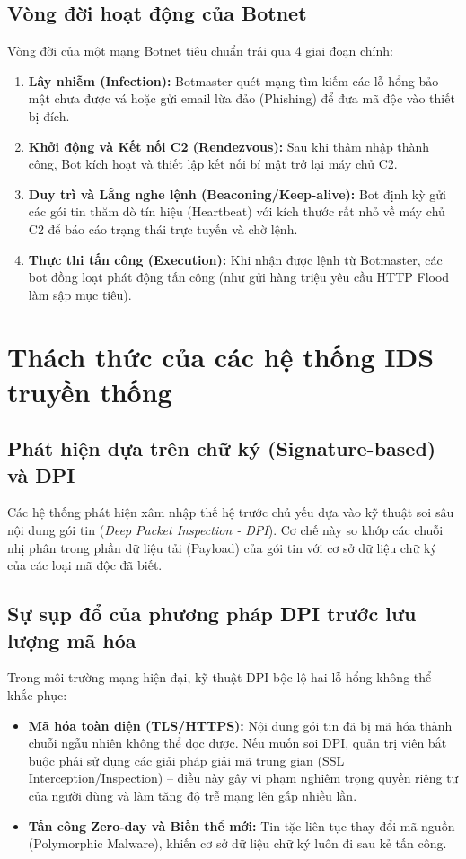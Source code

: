 \documentclass[12pt,a4paper,oneside]{report}
\begin{document}
\subsection{Vòng đời hoạt động của Botnet}
Vòng đời của một mạng Botnet tiêu chuẩn trải qua 4 giai đoạn chính:
\begin{enumerate}
  \item \textbf{Lây nhiễm (Infection):} Botmaster quét mạng tìm kiếm các lỗ hổng bảo mật chưa được vá hoặc gửi email lừa đảo (Phishing) để đưa mã độc vào thiết bị đích.
  \item \textbf{Khởi động và Kết nối C2 (Rendezvous):} Sau khi thâm nhập thành công, Bot kích hoạt và thiết lập kết nối bí mật trở lại máy chủ C2.
  \item \textbf{Duy trì và Lắng nghe lệnh (Beaconing/Keep-alive):} Bot định kỳ gửi các gói tin thăm dò tín hiệu (Heartbeat) với kích thước rất nhỏ về máy chủ C2 để báo cáo trạng thái trực tuyến và chờ lệnh.
  \item \textbf{Thực thi tấn công (Execution):} Khi nhận được lệnh từ Botmaster, các bot đồng loạt phát động tấn công (như gửi hàng triệu yêu cầu HTTP Flood làm sập mục tiêu).
\end{enumerate}

\section{Thách thức của các hệ thống IDS truyền thống}
\subsection{Phát hiện dựa trên chữ ký (Signature-based) và DPI}
Các hệ thống phát hiện xâm nhập thế hệ trước chủ yếu dựa vào kỹ thuật soi sâu nội dung gói tin (\textit{Deep Packet Inspection - DPI}). Cơ chế này so khớp các chuỗi nhị phân trong phần dữ liệu tải (Payload) của gói tin với cơ sở dữ liệu chữ ký của các loại mã độc đã biết.

\subsection{Sự sụp đổ của phương pháp DPI trước lưu lượng mã hóa}
Trong môi trường mạng hiện đại, kỹ thuật DPI bộc lộ hai lỗ hổng không thể khắc phục:
\begin{itemize}
  \item \textbf{Mã hóa toàn diện (TLS/HTTPS):} Nội dung gói tin đã bị mã hóa thành chuỗi ngẫu nhiên không thể đọc được. Nếu muốn soi DPI, quản trị viên bắt buộc phải sử dụng các giải pháp giải mã trung gian (SSL Interception/Inspection) – điều này gây vi phạm nghiêm trọng quyền riêng tư của người dùng và làm tăng độ trễ mạng lên gấp nhiều lần.
  \item \textbf{Tấn công Zero-day và Biến thể mới:} Tin tặc liên tục thay đổi mã nguồn (Polymorphic Malware), khiến cơ sở dữ liệu chữ ký luôn đi sau kẻ tấn công.
\end{itemize}
\end{document}
